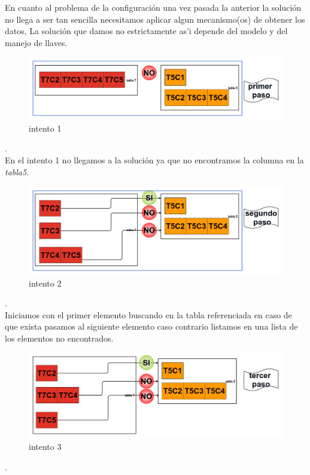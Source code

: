 En cuanto al problema de la configuraci\'on una vez pasada la anterior la soluci\'on no llega a ser tan sencilla necesitamos aplicar algun mecanismo(os) de obtener los datos, La soluci\'on que damos no estrictamente as'i depende del modelo y del manejo de llaves.\\
\begin{figure}[hbtp]
\centering
\includegraphics[scale=0.35]{images/paso1.png}
\caption{intento 1}\label{intento1}
\end{figure}.\\
En el intento 1 no llegamos a la soluci\'on ya que no encontramos la columna en la \textit{tabla5}.\\
\begin{figure}[hbtp]
\centering
\includegraphics[scale=0.35]{images/paso2.png}
\caption{intento 2}\label{intento2}
\end{figure}.\\
Iniciamos con el primer elemento buscando en la tabla referenciada en caso de que exista pasamos al siguiente elemento caso contrario listamos en una lista de los elementos no encontrados.\\
\begin{figure}[hbtp]
\centering
\includegraphics[scale=0.35]{images/paso3.png}
\caption{intento 3}\label{intento3}
\end{figure}.\\
